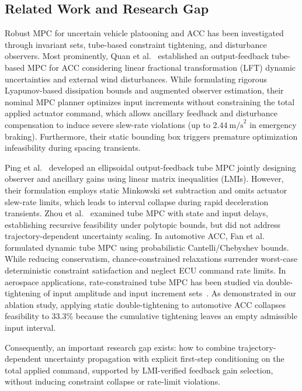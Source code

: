 \documentclass[journal]{IEEEtran}
\begin{document}
\subsection{Related Work and Research Gap}

Robust MPC for uncertain vehicle platooning and ACC has been investigated through invariant sets, tube-based constraint tightening, and disturbance observers. Most prominently, Quan et al.~\cite{Quan2024} established an output-feedback tube-based MPC for ACC considering linear fractional transformation (LFT) dynamic uncertainties and external wind disturbances. While formulating rigorous Lyapunov-based dissipation bounds and augmented observer estimation, their nominal MPC planner optimizes input increments without constraining the total applied actuator command, which allows ancillary feedback and disturbance compensation to induce severe slew-rate violations (up to $2.44~\text{m/s}^2$ in emergency braking). Furthermore, their static bounding box triggers premature optimization infeasibility during spacing transients.

Ping et al.~\cite{Ping2023} developed an ellipsoidal output-feedback tube MPC jointly designing observer and ancillary gains using linear matrix inequalities (LMIs). However, their formulation employs static Minkowski set subtraction and omits actuator slew-rate limits, which leads to interval collapse during rapid deceleration transients. Zhou et al.~\cite{Zhou2024} examined tube MPC with state and input delays, establishing recursive feasibility under polytopic bounds, but did not address trajectory-dependent uncertainty scaling. In automotive ACC, Fan et al.~\cite{Fan2024} formulated dynamic tube MPC using probabilistic Cantelli/Chebyshev bounds. While reducing conservatism, chance-constrained relaxations surrender worst-case deterministic constraint satisfaction and neglect ECU command rate limits. In aerospace applications, rate-constrained tube MPC has been studied via double-tightening of input amplitude and input increment sets~\cite{Richards2006}. As demonstrated in our ablation study, applying static double-tightening to automotive ACC collapses feasibility to 33.3\% because the cumulative tightening leaves an empty admissible input interval.

Consequently, an important research gap exists: how to combine trajectory-dependent uncertainty propagation with explicit first-step conditioning on the total applied command, supported by LMI-verified feedback gain selection, without inducing constraint collapse or rate-limit violations.
\end{document}
